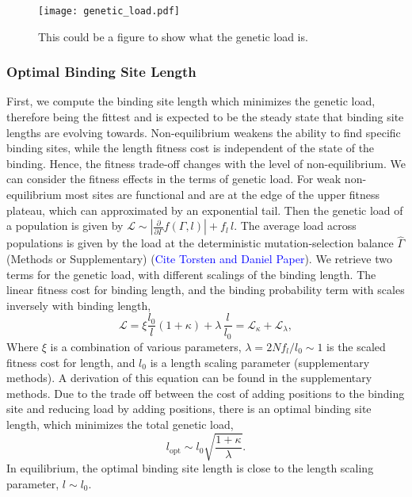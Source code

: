 \documentclass[10pt,a4paper]{article}
\begin{document}
    	\begin{figure}[H]
    	\centering
    	\texttt{[image: genetic\_load.pdf]}\caption{This could be a figure to show what the genetic load is.}\label{fig:load_theory}
    \end{figure}


	\subsubsection*{Optimal Binding Site Length}
	First, we compute the binding site length which minimizes the genetic load, therefore being the fittest and is expected to be the steady state that binding site lengths are evolving towards.
	Non-equilibrium weakens the ability to find specific binding sites, while the length fitness cost is independent of the state of the binding. Hence, the fitness trade-off changes with the level of non-equilibrium. We can consider the fitness effects in the terms of genetic load. For weak non-equilibrium most sites are functional and are at the edge of the upper fitness plateau, which can approximated by an exponential tail. Then the genetic load of a population is given by $\mathcal{L}\sim \left|\frac{\partial}{\partial \Gamma} f(\Gamma,l)\right|+f_l\,l$. The average load across populations is given by the load at the deterministic mutation-selection balance $\hat{\Gamma}$(Methods or Supplementary) (\textcolor{blue}{Cite Torsten and Daniel Paper}). We retrieve two terms for the genetic load, with different scalings of the binding length. The linear fitness cost for binding length, and the binding probability term with scales inversely with binding length,
	\begin{equation}
		\mathcal{L} = \xi \frac{l_0}{l}(1+\kappa)+\lambda \, \frac{l}{l_0} = \mathcal{L}_\kappa + \mathcal{L}_\lambda,
		\label{equ:maintext_load}
	\end{equation}
	Where $\xi$ is a combination of various parameters, $\lambda=2Nf_l/l_0\sim 1$ is the scaled fitness cost for length,  and $l_0$ is a length scaling parameter (supplementary methods). A derivation of this equation can be found in the supplementary methods. Due to the trade off between the cost of adding positions to the binding site and reducing load by adding positions, there is an optimal binding site length, which minimizes the total genetic load,
	\begin{equation}
		l_\text{opt}\sim l_0\sqrt{\frac{1+\kappa}{\lambda}}.
	\end{equation}
	In equilibrium, the optimal binding site length is close to the length scaling parameter, $l\sim l_0$.  
\end{document}
